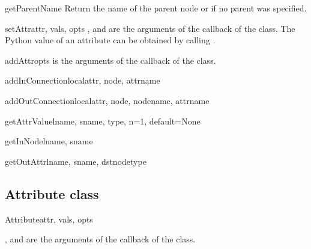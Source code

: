 \begin{methoddesc}{getParentName}{}
Return the name of the parent node or  if no parent was specified.
\end{methoddesc}

\begin{methoddesc}{setAttr}{attr, vals, opts}
,  and  are the arguments of the 
 callback of the  class. The Python
value of an attribute can be obtained by calling .
\end{methoddesc}

\begin{methoddesc}{addAttr}{opts}
 is the arguments of the  callback of 
the  class.
\end{methoddesc}

\begin{methoddesc}{addInConnection}{localattr, node, attrname}
\end{methoddesc}

\begin{methoddesc}{addOutConnection}{localattr, node, nodename, attrname}
\end{methoddesc}

\begin{methoddesc}{getAttrValue}{lname, sname, type, n=1, default=None}
\end{methoddesc}

\begin{methoddesc}{getInNode}{lname, sname}
\end{methoddesc}

\begin{methoddesc}{getOutAttr}{lname, sname, dstnodetype}
\end{methoddesc}

\subsection{Attribute class}

\begin{classdesc}{Attribute}{attr, vals, opts}

,  and  are the arguments of the 
 callback of the  class.

\end{classdesc}

